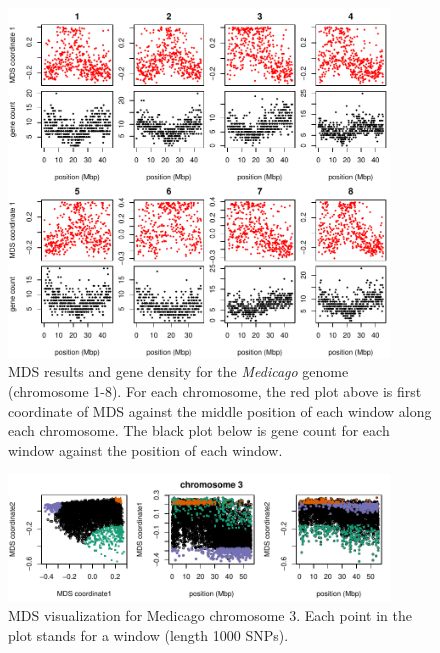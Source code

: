 \documentclass[11pt, oneside]{article}   	%
\begin{document}
\begin{figure}
    \begin{center}
       \includegraphics[width=0.9\textwidth]{Fig5_MDS_and_gene_count_allchr}
    \end{center}
    \caption{
         MDS results and gene density for the \textit{Medicago} genome (chromosome 1-8). 
         For each chromosome, the red plot above is first coordinate of MDS against the middle position of each window along each chromosome. 
         The black plot below is gene count for each window against the position of each window.
         \label{fig:mds_medicago}
    }
\end{figure}

\begin{figure}
    \begin{center}
       \includegraphics[width=0.9\textwidth]{Fig6_Together_MDS_plot_chr3_final}
    \end{center}
    \caption{
     MDS visualization for Medicago chromosome 3. Each point in the plot stands for a window (length 1000 SNPs).
       \label{fig:mds12_medicago}
    }
\end{figure}
\end{document}
